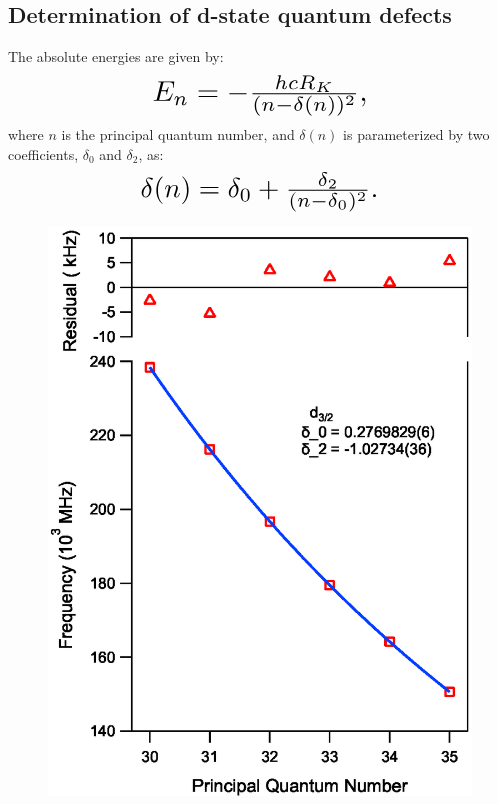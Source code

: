 \documentclass[landscape]{sciposter}
\begin{document}
\begin{multicols}{4}
\section*{\large Determination of d-state quantum defects}
The absolute energies are given by:
\begin{equation*}
\resizebox{0.45\hsize}{!}{$E_n = -\frac{hcR_K}{(n - \delta(n))^2},$}
\end{equation*}
where $n$ is the principal quantum number, and $\delta(n)$ is parameterized by two coefficients, $\delta_0$ and $\delta_2$, as:
\begin{equation*}
\resizebox{0.5\hsize}{!}{$\delta(n) = \delta_0 + \frac{\delta_2}{(n-\delta_0)^2}.$}
\end{equation*}

\begin{figure}
\begin{center}
\includegraphics[scale = 0.97]{d32_qd.eps}

\end{center}
\end{figure}
\end{multicols}
\end{document}
